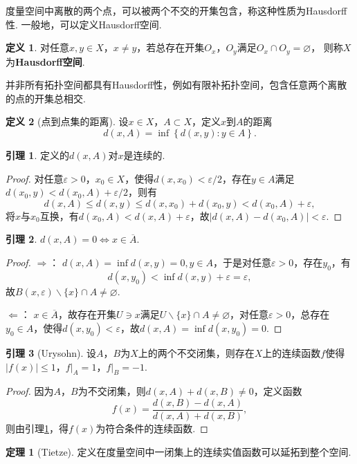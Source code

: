 \documentclass[12pt]{ctexart}
\theoremstyle{definition}
\newtheorem{definition}{定义}
\newtheorem{theorem}{定理}
\newtheorem{lemma}{引理}
\theoremstyle{plain}
\begin{document}
	度量空间中离散的两个点，可以被两个不交的开集包含，称这种性质为Hausdorff性. 一般地，可以定义Hausdorff空间.
	\begin{definition}
		对任意$x,y\in X$，$x\neq y$，若总存在开集$O_x$，$O_y$满足$O_x\cap O_y=\varnothing$，
		则称$X$为\textbf{Hausdorff空间}.
	\end{definition}
	并非所有拓扑空间都具有Hausdorff性，例如有限补拓扑空间，包含任意两个离散的点的开集总相交.
	\begin{definition}[点到点集的距离]
		设$x\in X$，$A\subset X$，定义$x$到$A$的距离
		$$d(x,A)=\inf\left\{d(x,y):y\in A\right\}.$$
	\end{definition}
	\begin{lemma}\label{conti}
		定义的$d(x,A)$对$x$是连续的.
	\end{lemma}
	\begin{proof}
		对任意$\varepsilon>0$，$x_0\in X$，使得$d(x,x_0)<{\varepsilon}/{2}$，存在$y\in A$满足$d(x_0,y)<d(x_0,A)+\varepsilon/2$，则有
		$$d(x,A)\leqslant d(x,y)\leqslant d(x,x_0)+d(x_0,y)<d(x_0,A)+\varepsilon,$$
		将$x$与$x_0$互换，有$d(x_0,A)<d(x,A)+\varepsilon$，故$|d(x,A)-d(x_0,A)|<\varepsilon$.
	\end{proof}
	\begin{lemma}
		$d(x,A)=0\iff x\in\overline{A}$.
	\end{lemma}
	\begin{proof}
		$\Rightarrow$： $d(x,A)=\inf d(x,y)=0 , y\in A$，于是对任意$\varepsilon>0$，存在$y_0$，有
		$$d(x,y_0)<\inf d(x,y)+\varepsilon=\varepsilon,$$
		 故$B(x,\varepsilon)\backslash\{x\}\cap A\neq\varnothing$.
		 
		$\Leftarrow$： $x\in\overline{A}$，故存在开集$U\ni x$满足$U\backslash\{x\}\cap A\neq\varnothing$，对任意$\varepsilon>0$，总存在$y_0\in A$，使得$d(x,y_0)<\varepsilon$，故$d(x,A)=\inf d(x,y_0)=0$.
	\end{proof}
	\begin{lemma}[Urysohn]\label{urysohn}
		设$A$，$B$为$X$上的两个不交闭集，则存在$X$上的连续函数$f$使得$|f(x)|\leqslant 1$，$f\big|_A=1$，$f\big|_B=-1$.
	\end{lemma}
	\begin{proof}
		因为$A$，$B$为不交闭集，则$d(x,A)+d(x,B)\neq 0$，定义函数
		$$f(x)=\frac{d(x,B)-d(x,A)}{d(x,A)+d(x,B)},$$
		则由引理\ref{conti}，得$f(x)$为符合条件的连续函数.
	\end{proof}
	\begin{theorem}[Tietze]
		定义在度量空间中一闭集上的连续实值函数可以延拓到整个空间.
	\end{theorem}
\end{document}
